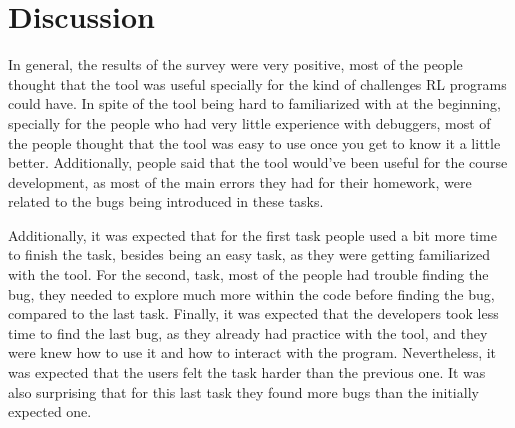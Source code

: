
\section{Discussion}
\label{sec:discussion}

In general, the results of the survey were very positive, most of the people thought that 
the tool was useful specially for the kind of challenges \ac{RL} programs could have. In 
spite of the tool being hard to familiarized with at the beginning, specially for the people who had very 
little experience with debuggers, most of the people thought that the tool was easy to use 
once you get to know it a little better. Additionally, people said that the tool would've 
been useful for the course development, as most of the main errors they had for their homework,
were related to the bugs being introduced in these tasks.

Additionally, it was expected that for the first task people used a bit more time to finish the 
task, besides being an easy task, as they were getting familiarized with the tool. For the second,
task, most of the people had trouble finding the bug, they needed to explore much more within the 
code before finding the bug, compared to the last task. Finally, it was expected that the developers
took less time to find the last bug, as they already had practice with the tool, and they were 
knew how to use it and how to interact with the program. Nevertheless, it was expected that 
the users felt the task harder than the previous one. It was also surprising that for this last task 
they found more bugs than the initially expected one.

\endinput

